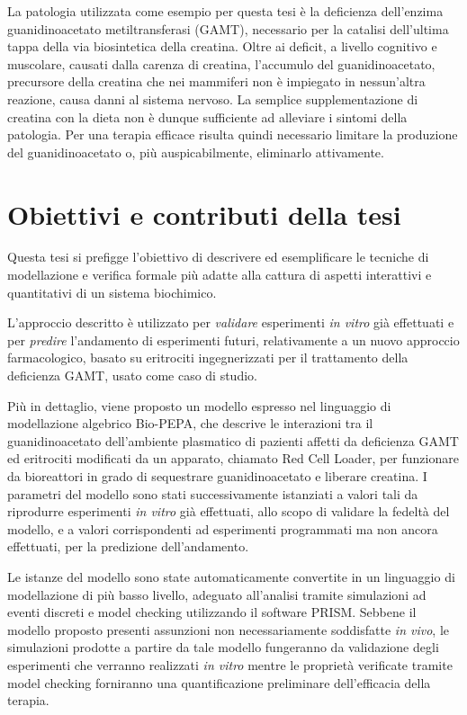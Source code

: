 		La patologia utilizzata come esempio per questa tesi \`e la deficienza dell'enzima guanidinoacetato metiltransferasi (GAMT), necessario per la catalisi dell'ultima tappa della via biosintetica della creatina.
		Oltre ai deficit, a livello cognitivo e muscolare, causati dalla carenza di creatina, l'accumulo del guanidinoacetato, precursore della creatina che nei mammiferi non \`e impiegato in nessun'altra reazione, causa danni al sistema nervoso.
		La semplice supplementazione di creatina con la dieta non \`e dunque sufficiente ad alleviare i sintomi della patologia.
		Per una terapia efficace risulta quindi necessario limitare  la produzione del guanidinoacetato o, pi\`u auspicabilmente, eliminarlo attivamente.
	
	\section{Obiettivi e contributi della tesi}
	Questa tesi si prefigge l'obiettivo di descrivere ed esemplificare le tecniche di modellazione e verifica formale pi\`u adatte alla cattura di aspetti interattivi e quantitativi di un sistema biochimico.

	L'approccio descritto \`e utilizzato per \emph{validare} esperimenti \emph{in vitro} gi\`a effettuati e per \emph{predire} l'andamento di esperimenti futuri, relativamente a un nuovo approccio farmacologico, basato su eritrociti ingegnerizzati per il trattamento della deficienza GAMT, usato come caso di studio.
	
	Pi\`u in dettaglio, viene proposto un modello espresso nel linguaggio di modellazione algebrico Bio-PEPA, che descrive le interazioni tra il guanidinoacetato dell'ambiente plasmatico di pazienti affetti da deficienza GAMT ed eritrociti modificati da un apparato, chiamato Red Cell Loader, per funzionare da bioreattori in grado di sequestrare guanidinoacetato e liberare creatina.
	I parametri del modello sono stati successivamente istanziati a valori tali da riprodurre esperimenti \emph{in vitro} gi\`a effettuati, allo scopo di validare la fedelt\`a del modello, e a valori corrispondenti ad esperimenti programmati ma non ancora effettuati, per la predizione dell'andamento.
	
	Le istanze del modello sono state automaticamente convertite in un linguaggio di modellazione di pi\`u basso livello, adeguato all'analisi tramite simulazioni ad eventi discreti e model checking utilizzando il software PRISM.
	Sebbene il modello proposto presenti assunzioni non necessariamente soddisfatte \emph{in vivo}, le simulazioni prodotte a partire da tale modello fungeranno da validazione degli esperimenti che verranno realizzati \emph{in vitro} mentre le propriet\`a verificate tramite model checking forniranno una quantificazione preliminare dell'efficacia della terapia.

